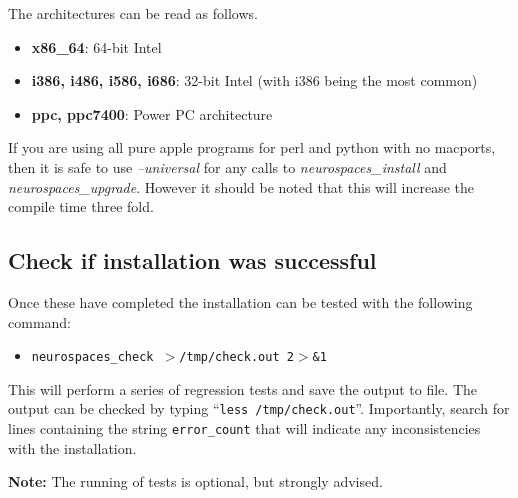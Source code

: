 \documentclass[12pt]{article}
\begin{document}
The architectures can be read as follows.

\begin{itemize}
   \item[] {\bf x86\_64}: 64-bit Intel 
   \item[] {\bf i386, i486, i586, i686}: 32-bit Intel (with i386 being the most common)
   \item[] {\bf ppc, ppc7400}: Power PC architecture
\end{itemize}

If you are using all pure apple programs for perl and python with no macports, then it is safe to use {\it --universal} for any calls to {\it neurospaces\_install} and {\it neurospaces\_upgrade}. However it should be noted that this will increase the compile time three fold.

\subsection*{Check if installation was successful}

Once these have completed the installation can be tested with the following command:
\begin{itemize}
   \item[]{\tt neurospaces\_check $>$/tmp/check.out 2$>$\&1}
\end{itemize}
This will perform a series of regression tests and save the output to file. The output can be checked by typing ``{\tt less /tmp/check.out}''. Importantly, search for lines containing the string {\tt error\_count} that will indicate any inconsistencies with the installation.

{\bf Note:} The running of tests is optional, but strongly advised.
\end{document}
